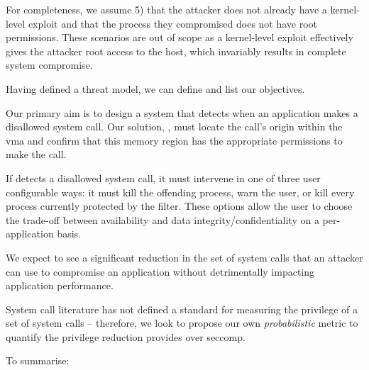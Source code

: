 For completeness, we assume 5) that the attacker does not already have a 
kernel-level exploit and that the process they compromised does not have root
permissions. These scenarios are out of scope as a kernel-level exploit effectively gives the
attacker root access to the host, which invariably results in complete system compromise.



Having defined a threat model, we can define and list our objectives.

Our primary aim is to design a system that detects when an application
makes a disallowed system call. Our solution, \af,  must locate the call's origin
within the \ac{vma} and confirm that this memory region has the
appropriate permissions to make the call.

If \af detects a disallowed system call, it must intervene in one of three user
configurable ways: it must kill the offending process, warn the user, or
kill every process currently protected by the filter. These options allow the user to
choose the trade-off between availability and data integrity/confidentiality on
a per-application basis.

We expect to see a significant reduction in the set of system calls that an
attacker can use to compromise an application without detrimentally impacting
application performance. 

System call literature has not defined a standard for measuring the privilege
of a set of system calls -- therefore, we look to propose our own
\textit{probabilistic} metric to quantify the privilege reduction \af
provides over seccomp.

To summarise:

